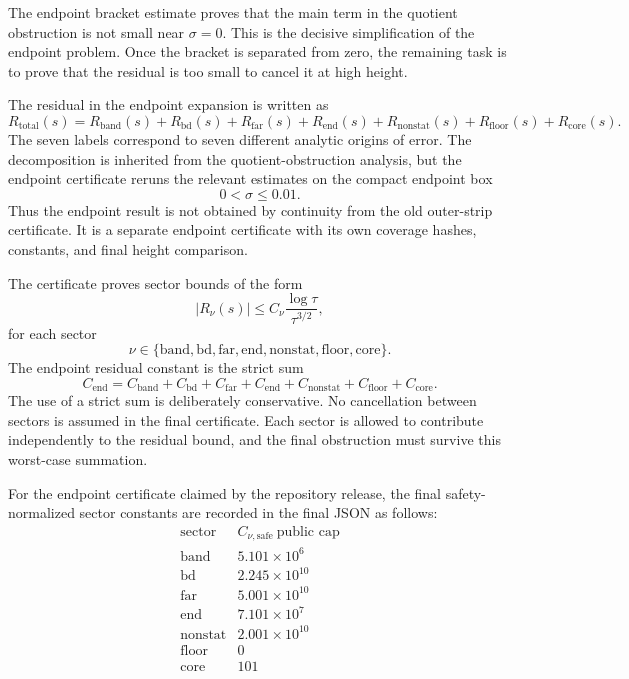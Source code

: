 \documentclass[11pt]{article}
\newcommand{\Rtot}{R_{\mathrm{total}}}
\newcommand{\Cend}{C_{\mathrm{end}}}
\begin{document}
The endpoint bracket estimate proves that the main term in the quotient obstruction is not small near \(\sigma=0\).  This is the decisive simplification of the endpoint problem.  Once the bracket is separated from zero, the remaining task is to prove that the residual is too small to cancel it at high height.

The residual in the endpoint expansion is written as
\[
\Rtot(s)
=
R_{\mathrm{band}}(s)
+
R_{\mathrm{bd}}(s)
+
R_{\mathrm{far}}(s)
+
R_{\mathrm{end}}(s)
+
R_{\mathrm{nonstat}}(s)
+
R_{\mathrm{floor}}(s)
+
R_{\mathrm{core}}(s).
\]
The seven labels correspond to seven different analytic origins of error.  The decomposition is inherited from the quotient-obstruction analysis, but the endpoint certificate reruns the relevant estimates on the compact endpoint box
\[
0< \sigma\leq 0.01.
\]
Thus the endpoint result is not obtained by continuity from the old outer-strip certificate.  It is a separate endpoint certificate with its own coverage hashes, constants, and final height comparison.

The certificate proves sector bounds of the form
\[
|R_\nu(s)|
\leq
C_\nu\frac{\log\tau}{\tau^{3/2}},
\]
for each sector
\[
\nu\in
\{
\mathrm{band},
\mathrm{bd},
\mathrm{far},
\mathrm{end},
\mathrm{nonstat},
\mathrm{floor},
\mathrm{core}
\}.
\]
The endpoint residual constant is the strict sum
\[
\Cend
=
C_{\mathrm{band}}
+
C_{\mathrm{bd}}
+
C_{\mathrm{far}}
+
C_{\mathrm{end}}
+
C_{\mathrm{nonstat}}
+
C_{\mathrm{floor}}
+
C_{\mathrm{core}}.
\]
The use of a strict sum is deliberately conservative.  No cancellation between sectors is assumed in the final certificate.  Each sector is allowed to contribute independently to the residual bound, and the final obstruction must survive this worst-case summation.

For the endpoint certificate claimed by the repository release, the final safety-normalized sector constants are recorded in the final JSON as follows:
\[
\begin{array}{c|c}
\text{sector} & C_{\nu,\mathrm{safe}}\ \text{public cap} \\ \hline
\mathrm{band} & 5.101\times10^6 \\
\mathrm{bd} & 2.245\times10^{10} \\
\mathrm{far} & 5.001\times10^{10} \\
\mathrm{end} & 7.101\times10^7 \\
\mathrm{nonstat} & 2.001\times10^{10} \\
\mathrm{floor} & 0 \\
\mathrm{core} & 101
\end{array}
\]
\end{document}
